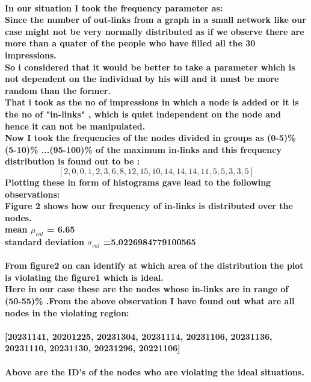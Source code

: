 \documentclass{article}
\begin{document}
\paragraph{In our situation I took the frequency parameter as:\\Since the number of out-links from a graph in a small network like our case might not be very normally distributed as if we observe there are more than a quater of the people who have filled all the 30 impressions. \\So i considered that it would be better to take a parameter which is not dependent on the individual by his will and it must be more random than the former.\\That i took as the no of impressions in which a node is added or it is the no of "in-links" , which is quiet independent on the node and hence it can not be manipulated.\\Now I took the frequencies of the nodes divided in groups as (0-5)\% (5-10)\% ...(95-100)\% of the maximum in-links and this frequency distribution is found out to be :$$[2, 0, 0, 1, 2, 3, 6, 8, 12, 15, 10, 14, 14, 14, 11, 5, 5, 3, 3, 5]
$$ Plotting these in form of histograms gave lead to the following observations: \\Figure 2 shows how our frequency of in-links is distributed over the nodes.\\ mean $\mu_{cal}$ = 6.65 \\ standard deviation $\sigma_{cal}$ =5.0226984779100565}

\paragraph{From figure2 on can identify at which area of the distribution the plot is violating the figure1 which is ideal. \\Here in our case these are the nodes whose in-links are in range of (50-55)\% .From the above observation I have found out what are all nodes in the violating region: 
}
\paragraph{[20231141, 20201225, 20231304, 20231114, 20231106, 20231136, 20231110, 20231130, 20231296, 20221106]} 
\paragraph{Above are the ID's of the nodes who are violating the ideal situations.}
\end{document}
